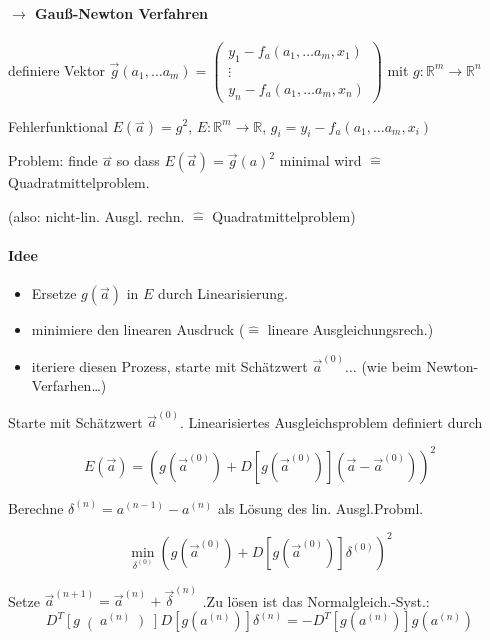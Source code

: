 \documentclass[a4paper,ngerman]{scrbook}
\newcommand{\R}{\ensuremath{\mathds{R}}}%
\newcommand{\rharp}[1]{\ensuremath{\overset{\rightharpoonup}{#1}}}%
\newcommand{\un}[2]{\ensuremath{#1^{(#2)}}}%
\begin{document}
\paragraph{$\to$ Gauß-Newton Verfahren}

definiere Vektor $\vec{g}(a_1,\dots a_m) =
\begin{pmatrix}
  y_1 - f_a(a_1, \dots a_m,x_1)\\
  \vdots\\
  y_n - f_a(a_1, \dots a_m, x_n)
\end{pmatrix}$ mit $g\colon \R^m \to \R^n$

Fehlerfunktional $E(\rharp{a}) = g^2$, $E\colon \R^m \to \R$, $g_i = y_i - f_a(a_1,\dots a_m, x_i)$

Problem: finde \rharp{a} so dass $E(\vec{a}) = \vec{g}(a)^2$ minimal wird $\hat{=}$ Quadratmittelproblem.

(also: nicht-lin\@. Ausgl\@. rechn\@. $\hat{=}$ Quadratmittelproblem)

\paragraph{Idee}

\begin{itemize}
\item Ersetze $g(\vec{a})$ in $E$ durch Linearisierung.
\item minimiere den linearen Ausdruck ($\hat{=}$ lineare Ausgleichungsrech.)
\item iteriere diesen Prozess, starte mit Schätzwert $\vec{a}^{(0)}\dots$ (wie beim Newton-Verfarhen\dots)
\end{itemize}

Starte mit Schätzwert $\vec{a}^{(0)}$. Linearisiertes Ausgleichsproblem definiert durch

\[
E(\vec{a}) = \left(g\left(\vec{a}^{(0)}\right) + D\left[ g\left(\vec{a}^{(0)}\right) \right] \left(\vec{a} - \vec{a}^{(0)}\right)\right)^2
\]

Berechne $\delta^{(n)} = a^{(n-1)} - a^{(n)}$ als Lösung des lin. Ausgl.Probml.

\[
\min\limits_{\delta^{(0)}} \left(g\left(\vec{a}^{(0)}\right) + D\left[ g\left(\vec{a}^{(0)}\right) \right] \delta^{(0)} \right)^2
\]

Setze $\un{\vec{a}}{n+1} = \un{\vec{a}}{n} + \un{\vec{\delta}}{n}$ .Zu lösen ist das Normalgleich.-Syst.:
\[
D^T \left[ g\right(a^{(n)}\left) \right] D\left[g\left(a^{(n)}\right)\right] \delta^{(n)} = - D^T\left[g\left(a^{(n)}\right)\right] g\left(a^{(n)}\right)
\]
\end{document}

